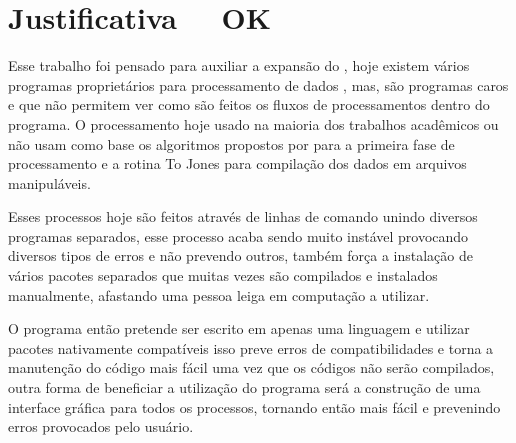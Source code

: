 \chapter{Justificativa \,\,\,\,\, OK}
\label{cap-justificativa}

    Esse trabalho foi pensado para auxiliar a expansão do \MT, hoje existem vários programas proprietários para processamento de dados \MT, mas, são programas caros e que não permitem ver como são feitos os fluxos de processamentos dentro do programa. O processamento hoje usado na maioria dos trabalhos acadêmicos ou não usam como base os algoritmos propostos por \citeauthor{egbert97} para a primeira fase de processamento e a rotina To Jones \cite{egbert97} para compilação dos dados em arquivos manipuláveis.
    
    Esses processos hoje são feitos através de linhas de comando unindo diversos programas separados, esse processo acaba sendo muito instável provocando diversos tipos de erros e não prevendo outros, também força a instalação de vários pacotes separados que muitas vezes são compilados e instalados manualmente, afastando uma pessoa leiga em computação a utilizar.
    
    O programa então pretende ser escrito em apenas uma linguagem e utilizar pacotes nativamente compatíveis isso preve erros de compatibilidades e torna a manutenção do código mais fácil uma vez que os códigos não serão compilados, outra forma de beneficiar a utilização do programa será a construção de uma interface gráfica para todos os processos, tornando então mais fácil e prevenindo erros provocados pelo usuário.    
    
    
